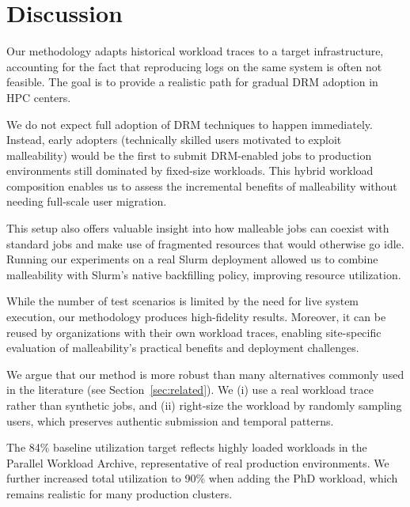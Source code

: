 \documentclass[a4paper,fleqn]{cas-dc}
\begin{document}
\section{Discussion}\label{sec:discussion}
Our methodology adapts historical workload traces to a target infrastructure, accounting for the fact that reproducing logs on the same system is often not feasible. The goal is to provide a realistic path for gradual DRM adoption in HPC centers.

We do not expect full adoption of DRM techniques to happen immediately. Instead, early adopters (technically skilled users motivated to exploit malleability) would be the first to submit DRM-enabled jobs to production environments still dominated by fixed-size workloads. This hybrid workload composition enables us to assess the incremental benefits of malleability without needing full-scale user migration.

This setup also offers valuable insight into how malleable jobs can coexist with standard jobs and make use of fragmented resources that would otherwise go idle. Running our experiments on a real Slurm deployment allowed us to combine malleability with Slurm’s native backfilling policy, improving resource utilization.

While the number of test scenarios is limited by the need for live system execution, our methodology produces high-fidelity results. Moreover, it can be reused by organizations with their own workload traces, enabling site-specific evaluation of malleability’s practical benefits and deployment challenges.

We argue that our method is more robust than many alternatives commonly used in the literature (see Section~\ref{sec:related}). We (i) use a real workload trace rather than synthetic jobs, and (ii) right-size the workload by randomly sampling users, which preserves authentic submission and temporal patterns.

The 84\% baseline utilization target reflects highly loaded workloads in the Parallel Workload Archive, representative of real production environments. We further increased total utilization to 90\% when adding the PhD workload, which remains realistic for many production clusters. 
\end{document}
